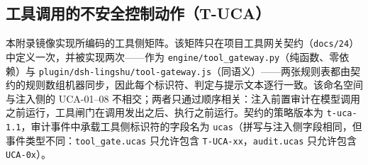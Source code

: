\subsection{工具调用的不安全控制动作（T-UCA）}

本附录镜像实现所编码的工具侧矩阵。该矩阵只在项目工具网关契约（\texttt{docs/24}）中定义一次，并被实现两次——作为 \texttt{engine/\allowbreak{}tool\_\allowbreak{}gateway.\allowbreak{}py}（纯函数、零依赖）与 \texttt{plugin/\allowbreak{}dsh-\allowbreak{}lingshu/\allowbreak{}tool-\allowbreak{}gateway.\allowbreak{}js}（同语义）——两张规则表都由契约的规则数组机器同步，因此每个标识符、判定与提示文本逐行一致。该命名空间与注入侧的 UCA-01--08 不相交；两者只通过顺序相关：注入前置审计在模型调用之前运行，工具闸门在调用发出之后、执行之前运行。契约的策略版本为 \texttt{t-uca-1.1}，审计事件中承载工具侧标识符的字段名为 \texttt{ucas}（拼写与注入侧字段相同，但事件类型不同：\texttt{tool\_gate.ucas} 只允许包含 \texttt{T-UCA-xx}，\texttt{audit.ucas} 只允许包含 \texttt{UCA-0x}）。

